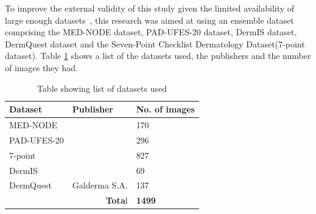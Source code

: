 \documentclass[12pt, a4paper]{article}
\begin{document}
To improve the external validity of this study given the limited availability of large enough datasets~\citep{yoon2019generalizable}, this research was aimed at using an ensemble dataset comprising the MED-NODE dataset, PAD-UFES-20 dataset, DermIS dataset, DermQuest dataset and the Seven-Point Checklist Dermatology Dataset(7-point dataset). Table \ref{tab:datasets} shows a list of the datasets used, the publishers and the number of images they had.
\begin{table}[h]
    \centering
    \begin{tabular}{|l|l|l|}
        \hline
        \textbf{Dataset}                     & \textbf{Publisher}       & \textbf{No. of images} \\\hline
        MED-NODE                             & \cite{giotis2015med}     & 170                    \\\hline
        PAD-UFES-20                          & \cite{PACHECO2020103545} & 296                    \\\hline
        7-point                              & \cite{8333693}           & 827                    \\\hline
        DermIS                               & \cite{dermis}            & 69                     \\\hline
        DermQuest                            & Galderma S.A.            & 137                    \\\hline
        \multicolumn{2}{|r|}{\textbf{Tota}l} & \textbf{1499}                                     \\\hline
    \end{tabular}
    \caption{Table showing list of datasets used}
    \label{tab:datasets}
\end{table}
\clearpage
\end{document}
